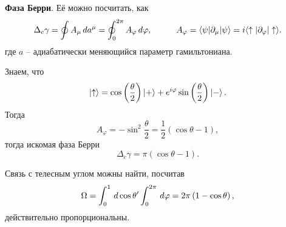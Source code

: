 \textbf{Фаза Берри}. Её можно посчитать, как
\begin{equation*}
    \Delta_c \gamma = \oint A_\mu \d a^\mu = \oint_0^{2 \pi} A_\varphi \d \varphi,
    \hspace{10 mm} 
    A_\varphi = \bk{\psi}[\partial_\mu]{\psi}= i \bk{\uparrow}[\partial_\varphi]{\uparrow}.
\end{equation*}
где $a$ -- адиабатически меняющийся параметр гамильтониана. 

Знаем, что
\begin{equation*}
    \left| \uparrow \right\rangle = \cos\left(\frac{\theta}{2}\right) \left| + \right\rangle + e^{i \varphi} \sin\left(\frac{\theta}{2}\right) \left| - \right\rangle.
\end{equation*}
Тогда
\begin{equation*}
    A_\varphi = -\sin^2 \frac{\theta}{2} = \frac{1}{2} \left(\cos \theta -1\right),
\end{equation*}
тогда искомая фаза Берри
\begin{equation*}
    \Delta_c \gamma = \pi \left(\cos \theta - 1\right).
\end{equation*}

Связь с телесным углом можны найти, посчитав
\begin{equation*}
    \Omega = \int_{0}^{1} \, d \cos \theta' \int_{0}^{2\pi} \, d \varphi = 2 \pi \left(1 - \cos \theta\right),
\end{equation*}
действительно пропорциональны.